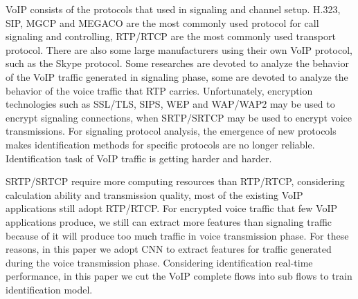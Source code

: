 \documentclass[conference]{IEEEtran}
\begin{document}

VoIP consists of the protocols that used in signaling and channel setup. H.323, SIP, MGCP and MEGACO are the most commonly used protocol for call signaling and controlling, RTP/RTCP are the most commonly used transport protocol. There are also some large manufacturers using their own VoIP protocol, such as the Skype protocol. Some researches are devoted to analyze the behavior of the VoIP traffic generated in signaling phase, some are devoted to analyze the behavior of the voice traffic that RTP carries. Unfortunately, encryption technologies such as SSL/TLS, SIPS, WEP and WAP/WAP2 may be used to encrypt signaling connections, when SRTP/SRTCP may be used to encrypt voice transmissions. For signaling protocol analysis, the emergence of new protocols makes identification methods for specific protocols are no longer reliable. Identification task of VoIP traffic is getting harder and harder.




SRTP/SRTCP require more computing resources than RTP/RTCP, considering calculation ability and transmission quality, most of the existing VoIP applications still adopt RTP/RTCP. For encrypted voice traffic that few VoIP applications produce, we still can extract more features than signaling traffic because of it will produce too much traffic in voice transmission phase. For these reasons, in this paper we adopt CNN to extract features for traffic generated during the voice transmission phase. Considering identification real-time performance, in this paper we cut the VoIP complete flows into sub flows to train identification model.
\end{document}
